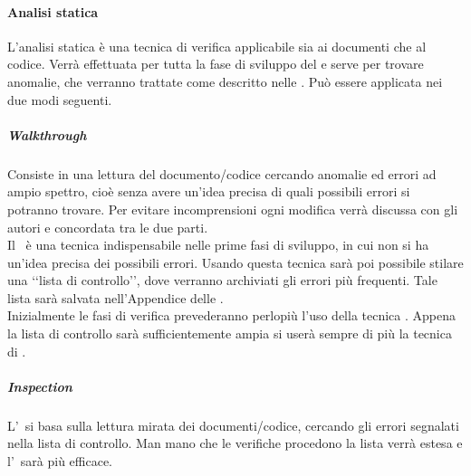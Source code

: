 	\paragraph{Analisi statica}
	\label{sec:3.2.1.2}
		L'analisi statica è una tecnica di verifica applicabile sia ai documenti che al codice. Verrà effettuata per tutta la fase di sviluppo del  e serve per trovare anomalie, che verranno trattate come descritto nelle \NPdoc. Può essere applicata nei due modi seguenti.
			\subparagraph{Walkthrough}
			\label{sec:3.2.1.2.1}
				Consiste in una lettura del documento/codice cercando anomalie ed errori ad ampio spettro, cioè senza avere un'idea precisa di quali possibili errori si potranno trovare. Per evitare incomprensioni ogni modifica verrà discussa con gli autori e concordata tra le due parti. \\
				Il \ è una tecnica indispensabile nelle prime fasi di sviluppo, in cui non si ha un'idea precisa dei possibili errori. Usando questa tecnica sarà poi possibile stilare una ‘‘lista di controllo’’, dove verranno archiviati gli errori più frequenti. Tale lista sarà salvata nell'Appendice delle \NPdoc. \\ %
				Inizialmente le fasi di verifica prevederanno perlopiù l'uso della tecnica . Appena la lista di controllo sarà sufficientemente ampia si userà sempre di più la tecnica di .
			\subparagraph{Inspection}
			\label{sec:3.2.1.2.2}
				L'\ si basa sulla lettura mirata dei documenti/codice, cercando gli errori segnalati nella lista di controllo. Man mano che le verifiche procedono la lista verrà estesa e l'\ sarà più efficace.
